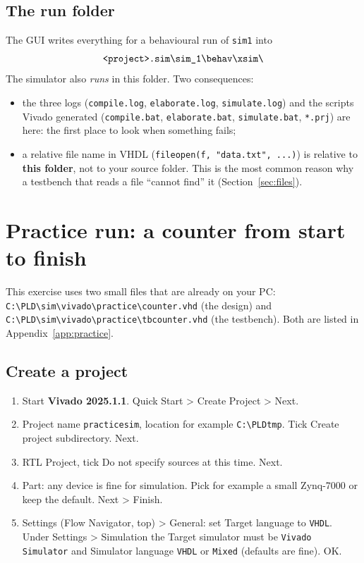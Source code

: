 \documentclass[11pt,a4paper]{article}
\newcommand{\code}[1]{\texttt{#1}}
\newcommand{\bs}{\textbackslash\allowbreak{}}
\renewcommand{\_}{\oldunderscore\allowbreak{}}
\newcommand{\pld}[1]{\code{C:\bs PLD\bs #1}}
\newcommand{\menu}[1]{\textsf{#1}}
\begin{document}
\subsection{The run folder}
The GUI writes everything for a behavioural run of \code{sim\_1} into
\[\code{<project>.sim\bs sim\_1\bs behav\bs xsim\bs}\]
The simulator also \emph{runs} in this folder. Two consequences:
\begin{itemize}[nosep]
  \item the three logs (\code{compile.log}, \code{elaborate.log}, \code{simulate.log}) and the scripts Vivado generated (\code{compile.bat}, \code{elaborate.bat}, \code{simulate.bat}, \code{*.prj}) are here: the first place to look when something fails;
  \item a relative file name in VHDL (\code{file\_open(f, "data.txt", ...)}) is relative to \textbf{this folder}, not to your source folder. This is the most common reason why a testbench that reads a file ``cannot find'' it (Section~\ref{sec:files}).
\end{itemize}

\section{Practice run: a counter from start to finish}\label{sec:practice}
This exercise uses two small files that are already on your PC:
\pld{sim\bs vivado\bs practice\bs counter.vhd} (the design) and \pld{sim\bs vivado\bs practice\bs tb\_counter.vhd} (the testbench). Both are listed in Appendix~\ref{app:practice}.

\subsection{Create a project}
\begin{enumerate}
  \item Start \textbf{Vivado 2025.1.1}. \menu{Quick Start > Create Project > Next}.
  \item Project name \code{practice\_sim}, location for example \code{C:\bs PLD\_tmp}. Tick \menu{Create project subdirectory}. \menu{Next}.
  \item \menu{RTL Project}, tick \menu{Do not specify sources at this time}. \menu{Next}.
  \item Part: any device is fine for simulation. Pick for example a small Zynq-7000 or keep the default. \menu{Next > Finish}.
  \item \menu{Settings} (Flow Navigator, top) \menu{> General}: set \menu{Target language} to \code{VHDL}. Under \menu{Settings > Simulation} the \menu{Target simulator} must be \code{Vivado Simulator} and \menu{Simulator language} \code{VHDL} or \code{Mixed} (defaults are fine). \menu{OK}.
\end{enumerate}
\end{document}
